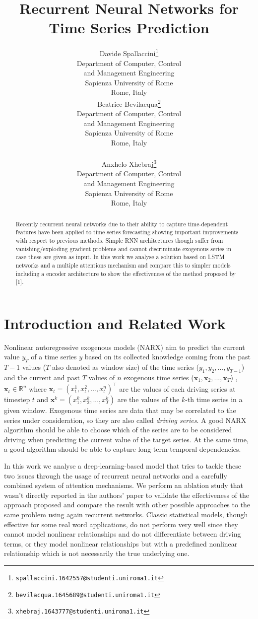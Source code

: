 \documentclass{article}
\title{Recurrent Neural Networks for Time Series Prediction}
\author{
  Davide Spallaccini\thanks{\texttt{spallaccini.1642557@studenti.uniroma1.it}}
\\
  Department of Computer, Control \\ and Management Engineering\\
  Sapienza University of Rome\\
  Rome, Italy \\
  \And
  Beatrice Bevilacqua\thanks{\texttt{bevilacqua.1645689@studenti.uniroma1.it}}
\\
  Department of Computer, Control \\ and Management Engineering\\
  Sapienza University of Rome\\
  Rome, Italy \\
   \\
  \And
  Anxhelo Xhebraj\thanks{\texttt{xhebraj.1643777@studenti.uniroma1.it}} \\
  Department of Computer, Control \\ and Management Engineering\\
  Sapienza University of Rome\\
  Rome, Italy
}
\begin{document}

\maketitle

\begin{abstract}

Recently recurrent neural networks due to their ability to capture
time-dependent
features have been applied to time series forecasting showing important
improvements with respect to previous methods. Simple RNN architectures though
suffer from vanishing/exploding gradient problems and cannot discriminate
exogenous series in case these are given as input. In this work we analyse a
solution based on LSTM networks and a multiple attentions mechanism and compare
this to simpler models including a encoder architecture
to show the effectiveness of the method proposed by [1].


\end{abstract}

\section{Introduction and Related Work}
\label{sec:intro}

Nonlinear autoregressive exogenous models (NARX) aim to predict the current
value $y_T$ of a time series $y$ based on its
collected knowledge coming from the past $T -1$ values ($T$ also denoted as
window size) of
the time series ($y_{1}, y_{2}, ..., y_{T-1}$) and the current and past $T$
values of $n$
exogenous time series ($\mathbf{x}_{1}, \mathbf{x}_{2}, ..., \mathbf{x}_{T}$)
, $\mathbf{x}_t \in \mathbb{R}^n$ where $\mathbf{x}_t = (x_t^1, x_t^2, ...,
x_t^n)^\top$
are the values of each driving series at timestep $t$ and $\mathbf{x}^k =
(x_1^k, x_2^k, ..., x_T^k)$ are the values of the $k$-th time series in a given
window. Exogenous time series
are data that may be correlated to the series under consideration, so they are
also called \textit{driving series}. A good NARX algorithm should be able to
choose which of the series are to be
considered driving when predicting the current value of the target series.
At the same time, a good algorithm should be able to capture long-term temporal
dependencies.

In this work we analyse a deep-learning-based model that tries to tackle
these two issues through the usage of
recurrent neural networks and a carefully combined system of attention
mechanisms. We perform an ablation study that wasn't directly reported in the
authors' paper to validate the effectiveness of the approach proposed and
compare the result with other possible approaches to the same problem using
again recurrent networks.
Classic statistical models, though effective for some real word applications,
do not perform very well since they cannot
model nonlinear relationships and do not differentiate between driving terms, or
they model nonlinear relationships
but with a predefined nonlinear relationship which is not necessarily the true
underlying one.
\end{document}
